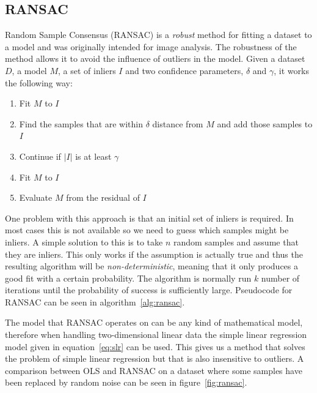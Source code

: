 \documentclass[a4paper]{report}
\begin{document}
\subsection{RANSAC}
Random Sample Consensus (RANSAC) \citep{fischler81} is a \emph{robust} method
for fitting a dataset to a model and was originally intended for image
analysis. The robustness of the method allows it to avoid the influence of
outliers in the model. Given a dataset $D$, a model $M$, a set of inliers $I$
and two confidence parameters, $\delta$ and $\gamma$, it works the following
way:

\begin{enumerate}
    \item Fit $M$ to $I$
    \item Find the samples that are within $\delta$ distance from $M$ and add
        those samples to $I$
    \item Continue if $|I|$ is at least $\gamma$
    \item Fit $M$ to $I$
    \item Evaluate $M$ from the residual of $I$
\end{enumerate}

One problem with this approach is that an initial set of inliers is required.
In most cases this is not available so we need to guess which samples might be
inliers. A simple solution to this is to take $n$ random samples and assume
that they are inliers. This only works if the assumption is actually true and
thus the resulting algorithm will be \emph{non-deterministic}, meaning that it
only produces a good fit with a certain probability. The algorithm is normally
run $k$ number of iterations until the probability of success is sufficiently
large. Pseudocode for RANSAC can be seen in algorithm~\ref{alg:ransac}.

The model that RANSAC operates on can be any kind of mathematical model, 
therefore when handling two-dimensional linear data the simple linear
regression model given in equation~\ref{eq:slr} can be used. This gives us a
method that solves the problem of simple linear regression but that is also
insensitive to outliers. A comparison between OLS and RANSAC on a dataset where
some samples have been replaced by random noise can be seen in
figure~\ref{fig:ransac}.
\end{document}
